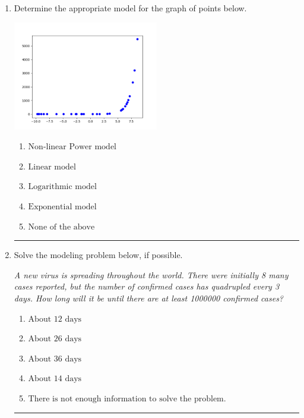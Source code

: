 \documentclass[14pt]{extbook}
\newcommand{\litem}[1]{\item#1\hspace*{-1cm}\rule{\textwidth}{0.4pt}}
\begin{document}
\begin{enumerate}
{\begin{enumerate}[label=\Alph*.]
\end{enumerate} }
\litem{
Determine the appropriate model for the graph of points below.
\begin{center}
    \includegraphics[width=0.5\textwidth]{../Figures/identifyModelGraph12CopyA.png}
\end{center}
\begin{enumerate}[label=\Alph*.]
\item \( \text{Non-linear Power model} \)
\item \( \text{Linear model} \)
\item \( \text{Logarithmic model} \)
\item \( \text{Exponential model} \)
\item \( \text{None of the above} \)

\end{enumerate} }
\litem{
Solve the modeling problem below, if possible.
\begin{center}
    \textit{ A new virus is spreading throughout the world. There were initially 8 many cases reported, but the number of confirmed cases has quadrupled every 3 days. How long will it be until there are at least 1000000 confirmed cases? }
\end{center}
\begin{enumerate}[label=\Alph*.]
\item \( \text{About } 12 \text{ days} \)
\item \( \text{About } 26 \text{ days} \)
\item \( \text{About } 36 \text{ days} \)
\item \( \text{About } 14 \text{ days} \)
\item \( \text{There is not enough information to solve the problem.} \)


\end{enumerate}}
\end{enumerate}
\end{document}

